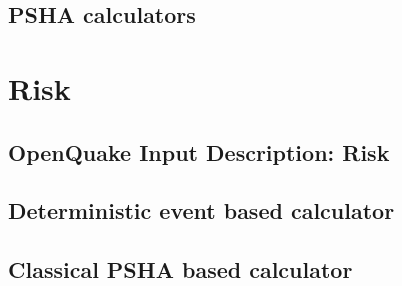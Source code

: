 \documentclass[12pt,a4paper,headings=small,version=first,dvips]{scrbook}
\begin{document}
\chapter{PSHA calculators}
	\label{chap:hazcalc}
	
%	
%	
\part{Risk}
\chapter{OpenQuake Input Description: Risk}
	
\chapter{Deterministic event based calculator}
	
\chapter{Classical PSHA based calculator}
	
\end{document}
